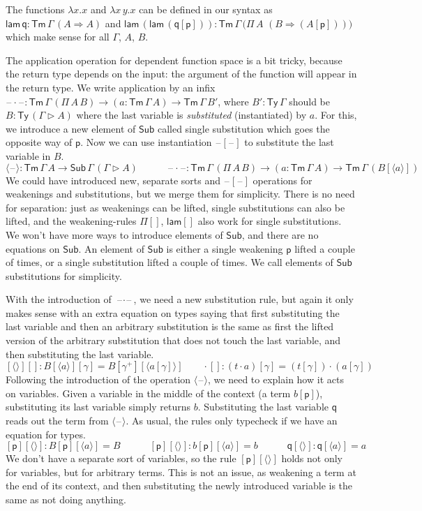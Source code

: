 \documentclass[a4paper,UKenglish,cleveref, autoref, thm-restate]{lipics-v2021}
\newcommand{\ra}{\rightarrow}
\newcommand{\Ra}{\Rightarrow}
\newcommand{\Ty}{\mathsf{Ty}}
\newcommand{\Tm}{\mathsf{Tm}}
\newcommand{\Sub}{\mathsf{Sub}}
\newcommand{\p}{\mathsf{p}}
\newcommand{\q}{\mathsf{q}}
\newcommand{\ext}{\mathop{\triangleright}}
\newcommand{\lam}{\mathsf{lam}}
\newcommand{\blank}{\mathord{\hspace{1pt}\text{--}\hspace{1pt}}} %
\begin{document}
The functions $\lambda x.x$ and $\lambda x\,y.x$ can be defined in our
syntax as $\lam\,\q : \Tm\,\Gamma\,(A\Ra A)$ and
$\lam\,(\lam\,(\q[\p])) :
\Tm\,\Gamma\,\big(\Pi\,A$ $(B\Ra(A[\p]))\big)$ which make sense for all
$\Gamma$, $A$, $B$.

The application operation for dependent function space is a bit
tricky, because the return type depends on the input: the argument of
the function will appear in the return type. We write application by
an infix $\blank\cdot\blank :
\Tm\,\Gamma\,(\Pi\,A\,B)\ra(a:\Tm\,\Gamma\,A)\ra\Tm\,\Gamma\,B'$,
where $B' : \Ty\,\Gamma$ should be $B:\Ty\,(\Gamma\ext A)$ where the
last variable is \emph{substituted} (instantiated) by $a$. For this,
we introduce a new element of $\Sub$ called single substitution which
goes the opposite way of $\p$. Now we can use instantiation
$\blank[\blank]$ to substitute the last variable in $B$.
\[
\langle\blank\rangle : \Tm\,\Gamma\,A\ra\Sub\,\Gamma\,(\Gamma\ext A) \hspace{3em}
\blank\cdot\blank : \Tm\,\Gamma\,(\Pi\,A\,B)\ra(a:\Tm\,\Gamma\,A)\ra\Tm\,\Gamma\,(B[\langle a\rangle])
\]
We could have introduced new, separate sorts and $\blank[\blank]$
operations for weakenings and substitutions, but we merge them for
simplicity. There is no need for separation: just as weakenings can be
lifted, single substitutions can also be lifted, and the
weakening-rules $\Pi[]$, $\lam[]$ also work for single
substitutions. We won't have more ways to introduce elements of
$\Sub$, and there are no equations on $\Sub$. An element of $\Sub$ is
either a single weakening $\p$ lifted a couple of times, or a single
substitution lifted a couple of times. We call elements of $\Sub$
substitutions for simplicity.

With the introduction of $\blank\cdot\blank$, we need a new
substitution rule, but again it only makes sense with an extra
equation on types saying that first substituting the last variable and
then an arbitrary substitution is the same as first the lifted version
of the arbitrary substitution that does not touch the last variable,
and then substituting the last variable.
\[
[\langle\rangle][] : B[\langle a\rangle][\gamma] = B[\gamma^+][\langle a[\gamma]\rangle] \hspace{2em}
{\cdot}[] : (t\cdot a)[\gamma] = (t[\gamma])\cdot(a[\gamma])
\]
Following the introduction of the operation $\langle\blank\rangle$, we
need to explain how it acts on variables. Given a variable in the
middle of the context (a term $b[\p]$), substituting its last variable
simply returns $b$. Substituting the last variable $\q$ reads out the
term from $\langle\blank\rangle$. As usual, the rules only typecheck
if we have an equation for types.
\[
[\p][\langle\rangle] : B[\p][\langle a\rangle] = B \hspace{3em}
[\p][\langle\rangle] : b[\p ][\langle a\rangle] = b \hspace{3em}
\q[\langle\rangle] : \q[\langle a\rangle] = a
\]
We don't have a separate sort of variables, so the rule
$[\p][\langle\rangle]$ holds not only for variables, but for arbitrary
terms. This is not an issue, as weakening a term at the end of its
context, and then substituting the newly introduced variable is the
same as not doing anything.
\end{document}

